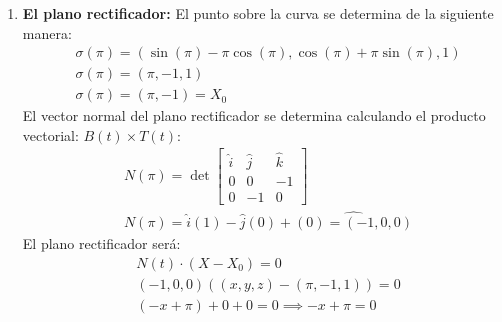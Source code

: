 \begin{enumerate}
	\item \textbf{El plano rectificador:}
	      El punto sobre la curva se determina de la siguiente manera:
	      \begin{align*}
		       & \sigma(\pi)=\left(\sin{(\pi)}-\pi\cos{(\pi)},\cos{(\pi)}+\pi\sin{(\pi)},1\right) \\
		       & \sigma{(\pi)}=(\pi,-1,1)                                                         \\
		       & \sigma(\pi)=\left(\pi,-1\right)=X_0
	      \end{align*}
	      El vector normal del plano rectificador se determina calculando el producto vectorial:
	      $B(t)\times T(t)$:
	      \begin{align*}
		       & N(\pi)=\det \begin{bmatrix}
			                     \hat{i} & \hat{j} & \hat{k} \\0&0&-1\\0&-1&0
		                     \end{bmatrix} \\
		       & N(\pi)=\hat{i}(1)-\hat{j}(0)+\hat{(0)=(-1,0,0)}
	      \end{align*}
	      El plano rectificador será:
	      \begin{align*}
		       & N(t)\cdot(X-X_0)=0                        \\
		       & (-1,0,0)\left((x,y,z)-(\pi,-1,1)\right)=0 \\
		       & (-x+\pi)+0+0=0\implies -x+\pi=0
	      \end{align*}


\end{enumerate}

